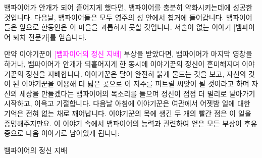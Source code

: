 \documentclass{report}
\begin{document}
	뱀파이어가 안개가 되어 흩어지게 했다면, 뱀파이어를 충분히 약화시키는데에 성공한 것입니다. 다음날, 뱀파이어들은 모두 영주의 성 안에서 칩거에 들어갑니다. 뱀파이어들은 앞으로 한동안은 이 마을을 괴롭히지 못할 것입니다. 서술이 없는 이야기 [뱀파이어 퇴치 전문가]를 얻습니다.
	
	만약 이야기꾼이 \textcolor{Magenta}{[뱀파이어의 정신 지배]} 부상을 받았다면, 뱀파이어가 마지막 영창을 하거나, 뱀파이어가 안개가 되흩어지게 한 동시에 이야기꾼의 정신이 혼미해지며 이야기꾼의 정신을 지배합니다. 이야기꾼은 달이 완전히 붉게 물드는 것을 보고, 자신의 것이 된 이야기꾼을 이용해 더 넓은 곳으로 이 저주를 퍼트릴 씨앗이 될 것이라고 하며 자신의 세상을 만들겠다는 뱀파이어의 목소리를 들으며 정신이 점점 더 멀리로 날아가기 시작하고, 이윽고 기절합니다. 다음날 아침에 이야기꾼은 여관에서 어젯밤 일에 대한 기억은 전혀 없는 채로 깨어납니다. 이야기꾼의 목에 생긴 두 개의 빨간 점은 이 일을 증명해주지만요. 이 이야기 속에서 뱀파이어의 능력과 관련하여 얻은 모든 부상이 후유증으로 다음 이야기로 남아있게 됩니다:
	
	\begin{lite}{뱀파이어의 정신 지배}
	\end{lite}
	
	
\end{document}
